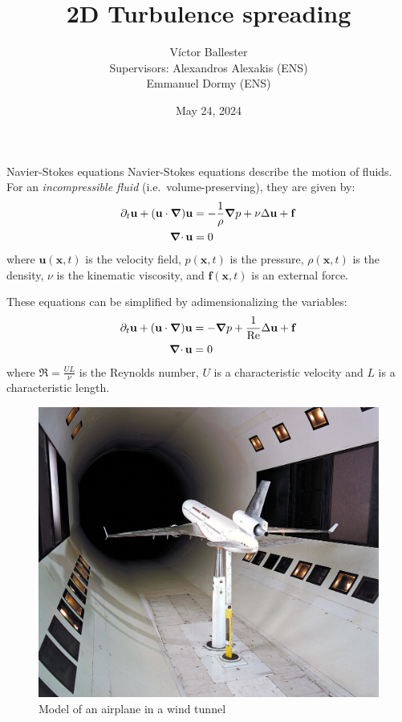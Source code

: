 \documentclass{beamer} %
\title{2D Turbulence spreading}
\author{
	Víctor Ballester\texorpdfstring{\vspace{0.45cm}\\}{}{\small Supervisors: Alexandros Alexakis (ENS)\texorpdfstring{\\}{}
\hspace{1.5cm} Emmanuel Dormy (ENS)}}
\date{May 24, 2024}
\begin{document}
\thispagestyle{empty}
\frame[noframenumbering]{\titlepage}
\setcounter{framenumber}{0}
\begin{frame}{Navier-Stokes equations}
	\textcolor{\mycolorhighlight}{Navier-Stokes equations} describe the motion of fluids. For an \emph{incompressible fluid} (i.e.\ volume-preserving), they are given by:
	\begin{align*}
		\partial_t \mathbf{u} + (\mathbf{u} \cdot \grad) \mathbf{u} & = -\frac{1}{\rho}\grad p + \nu \Delta \mathbf{u} + \mathbf{f} \\
		\operatorname{\boldsymbol{\mathrm{\nabla}}\cdot} \mathbf{u}                                            & = 0
	\end{align*}
	where $\mathbf{u}(\mathbf{x},t)$ is the velocity field, $p(\mathbf{x},t)$ is the pressure, $\rho(\mathbf{x},t)$ is the density, $\nu$ is the kinematic viscosity, and $\mathbf{f}(\mathbf{x},t)$ is an external force.

	\begin{minipage}{0.68\textwidth}
		\vspace{-0.5cm}
		These equations can be simplified by adimensionalizing the variables:
		\begin{align*}
			\partial_t \mathbf{u} + (\mathbf{u} \cdot \grad) \mathbf{u} & = -\grad p + \frac{1}{\Re}\Delta \mathbf{u} + \mathbf{f} \\
			\operatorname{\boldsymbol{\mathrm{\nabla}}\cdot} \mathbf{u}                                            & = 0
		\end{align*}
		where $\Re=\frac{UL}{\nu}$ is the Reynolds number, $U$ is a characteristic velocity and $L$ is a characteristic length.
	\end{minipage}
	\hfill
	\begin{minipage}{0.3\textwidth}
		\begin{figure}
			\centering
			\includegraphics[width=\textwidth]{images/windtunnel.jpg}
			\caption{Model of an airplane in a wind tunnel}
		\end{figure}
	\end{minipage}

\end{frame}
\end{document}
